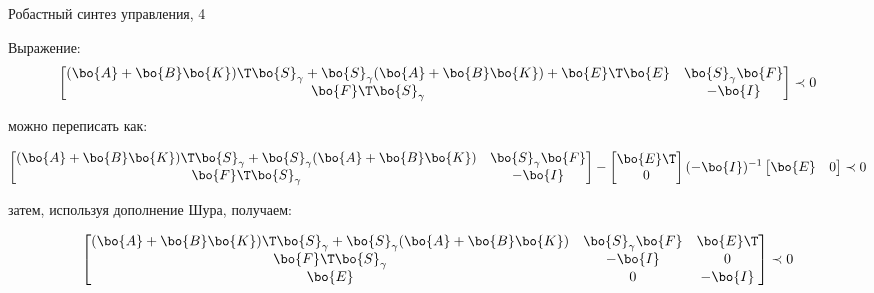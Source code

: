 \documentclass{beamer}
\begin{document}
\begin{frame}{Робастный синтез управления, 4}
	\begin{flushleft}
		
		Выражение:
		$$\begin{bmatrix}
			(\bo{A} + \bo{B}\bo{K})\T\bo{S}_\gamma + \bo{S}_\gamma (\bo{A} + \bo{B}\bo{K}) + \bo{E}\T \bo{E} & \bo{S}_\gamma\bo{F} \\
			\bo{F}\T\bo{S}_\gamma & -\bo{I}
		\end{bmatrix} \prec 0$$ 
		
		можно переписать как:
		
		\begin{equation*}
			\begin{bmatrix}
				(\bo{A} + \bo{B}\bo{K})\T\bo{S}_\gamma + \bo{S}_\gamma (\bo{A} + \bo{B}\bo{K}) & \bo{S}_\gamma\bo{F} \\
				\bo{F}\T\bo{S}_\gamma & -\bo{I}
			\end{bmatrix} 
			-
			\begin{bmatrix}
				\bo{E}\T \\
				0
			\end{bmatrix} 
			(-\bo{I})^{-1}
			\begin{bmatrix}
				\bo{E} & 0
			\end{bmatrix} 
			\prec 0
		\end{equation*}		
		
		затем, используя дополнение Шура, получаем:
		
		\begin{equation}
			\begin{bmatrix}
				(\bo{A} + \bo{B}\bo{K})\T\bo{S}_\gamma + \bo{S}_\gamma (\bo{A} + \bo{B}\bo{K}) & \bo{S}_\gamma\bo{F} & \bo{E}\T \\
				\bo{F}\T\bo{S}_\gamma & -\bo{I} & 0 \\
				\bo{E} & 0 & -\bo{I}
			\end{bmatrix} 
			\prec 0
		\end{equation}	
		
		
	\end{flushleft}
\end{frame}
\end{document}

